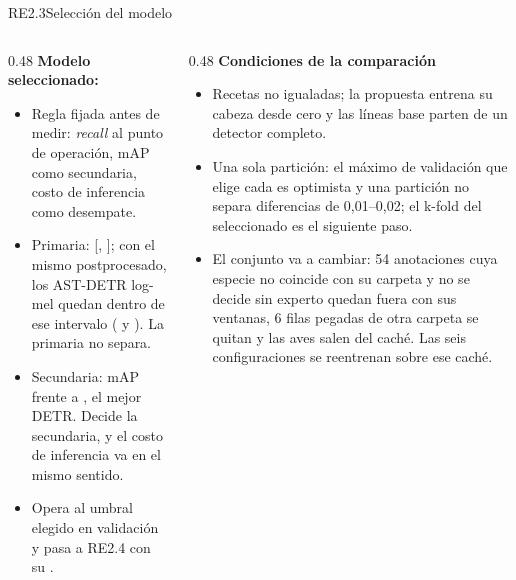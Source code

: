 \documentclass[aspectratio=169, 9pt]{beamer}
\newcommand{\valores}[1]{}
\begin{document}
\begin{frame}{RE2.3}{Selección del modelo}
    \valores{RE_2-3}
    
    \begin{columns}[T]
        \begin{column}{0.48\textwidth}
            \textbf{Modelo seleccionado: \bestModel{}}
            \begin{itemize}
                \item Regla fijada antes de medir: \textit{recall} al punto de operación,
                      mAP como secundaria, costo de inferencia como desempate.
                \item Primaria: \conNmsYoloRecall{} [\conNmsYoloRecallLow,
                      \conNmsYoloRecallHigh]; con el mismo postprocesado, los AST-DETR log-mel
                      quedan dentro de ese intervalo (\conNmsLogmelRecall{} y
                      \conNmsBirdsRecall{}). La primaria no separa.
                \item Secundaria: mAP \conNmsYoloMap{} frente a \conNmsBirdsMap{}, el mejor
                      DETR. Decide la secundaria, y el costo de inferencia va en el mismo
                      sentido.
                \item Opera al umbral \bestThreshold{} elegido en validación y pasa a RE2.4
                      con su .
            \end{itemize}
        \end{column}
        \begin{column}{0.48\textwidth}
            \textbf{Condiciones de la comparación}
            \begin{itemize}
                \item Recetas no igualadas; la propuesta entrena su cabeza desde cero y las
                      líneas base parten de un detector completo.
                \item Una sola partición: el máximo de validación que elige cada
                       es optimista y una partición no separa diferencias de
                      0,01--0,02; el k-fold del seleccionado es el siguiente paso.
                \item El conjunto va a cambiar: 54 anotaciones cuya especie no coincide con su
                      carpeta y no se decide sin experto quedan fuera con sus ventanas, 6 filas
                      pegadas de otra carpeta se quitan y las aves salen del caché. Las seis
                      configuraciones se reentrenan sobre ese caché.
            \end{itemize}
        \end{column}
    \end{columns}
\end{frame}
\end{document}
